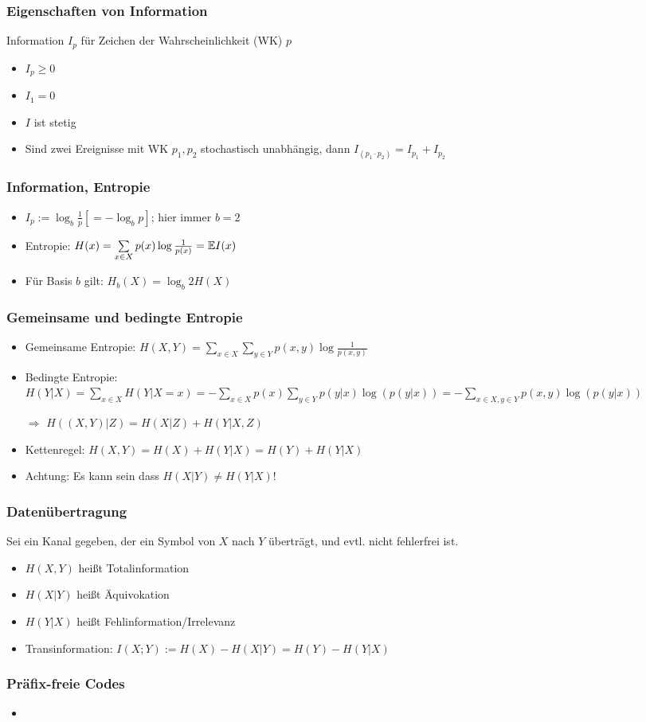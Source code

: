 \documentclass{beamer}
\newcommand{\E}{\ensuremath \mathbb{E}}
\begin{document}
\begin{frame}
\frametitle{Eigenschaften von Information}
Information $I_p$ für Zeichen der Wahrscheinlichkeit (WK) $p$
\begin{itemize}
\item $I_p\geq 0$
\item $I_1=0$
\item $I$ ist stetig
\item Sind zwei Ereignisse mit WK $p_1,p_2$ stochastisch unabhängig, dann $I_{(p_1\cdot p_2)}=I_{p_1}+I_{p_2}$
\end{itemize}
\end{frame}

\begin{frame}
\frametitle{Information, Entropie}
\begin{itemize}
\item $I_p:=\log_b\frac{1}{p} [=-\log_b p]$; hier immer $b=2$\pause
\item Entropie: $H(x)=\sum\limits_{x\in X}p(x)\log\frac{1}{p(x)}=\E I(x)$\pause
\item Für Basis $b$ gilt: $H_b(X) = \log_b 2 H(X)$
\end{itemize}
\end{frame}

\begin{frame}
\frametitle{Gemeinsame und bedingte Entropie}
\begin{itemize}
\item Gemeinsame Entropie: $H(X,Y)=\sum\limits_{x\in X}\sum\limits_{y\in Y}p(x,y)\log\frac{1}{p(x,y)}$\pause
\item Bedingte Entropie: $H(Y|X)=\sum\limits_{x\in X}H(Y|X=x)=-\sum\limits_{x\in X}p(x)\sum\limits_{y\in Y}p(y|x)\log(p(y|x))=-\sum\limits_{x\in X,y\in Y}p(x,y)\log(p(y|x))$
\item[$\Rightarrow$] $H((X,Y)|Z)=H(X|Z)+H(Y|X,Z)$
\pause
\item Kettenregel: $H(X,Y)=H(X)+H(Y|X)=H(Y)+H(Y|X)$
\item  Achtung: Es kann sein dass $H(X|Y)\neq H(Y|X)$!
\end{itemize}
\end{frame}

\begin{frame}
\frametitle{Datenübertragung}
Sei ein Kanal gegeben, der ein Symbol von $X$ nach $Y$ überträgt, und evtl. nicht fehlerfrei ist.
\begin{itemize}
\item $H(X,Y)$ heißt Totalinformation
\item $H(X|Y)$ heißt Äquivokation
\item $H(Y|X)$ heißt Fehlinformation/Irrelevanz\pause
\item Transinformation: $I(X;Y):=H(X)-H(X|Y)=H(Y)-H(Y|X)$
\end{itemize}
\end{frame}

\begin{frame}
\frametitle{Präfix-freie Codes}
\begin{itemize}
\item 
\end{itemize}
\end{frame}
\end{document}
